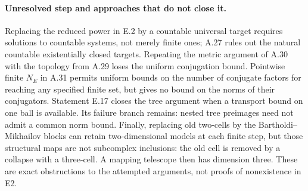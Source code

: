 \paragraph{Unresolved step and approaches that do not close it.}
Replacing the reduced power in E.2 by a countable
universal target requires solutions to countable
systems, not merely finite ones; A.27 rules out
the natural countable existentially closed
targets. Repeating the metric argument of
A.30 with the topology from A.29 loses the
uniform conjugation bound. Pointwise finite
$N_E$ in A.31 permits uniform bounds on the number of
conjugate factors for reaching any specified finite set,
but gives no bound on the norms of their conjugators.
Statement E.17 closes the tree argument when a transport
bound on one ball is available. Its failure branch remains:
nested tree preimages need not admit a common norm bound.
Finally, replacing old two-cells by the
Bartholdi--Mikhailov blocks can retain
two-dimensional models at each finite step,
but those structural maps are not subcomplex
inclusions: the old cell is removed by a
collapse with a three-cell. A mapping telescope
then has dimension three. These are exact
obstructions to the attempted arguments,
not proofs of nonexistence in E2.
